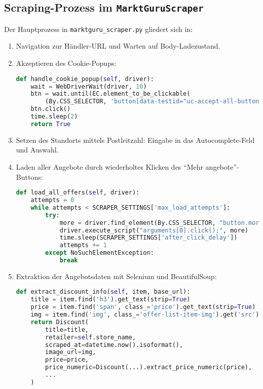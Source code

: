 \subsection{Scraping-Prozess im \texttt{MarktGuruScraper}}
Der Hauptprozess in \texttt{marktguru\_scraper.py} gliedert sich in:
\begin{enumerate}
  \item Navigation zur Händler-URL und Warten auf Body-Ladezustand.
  \item Akzeptieren des Cookie-Popups:
    \begin{lstlisting}[language=Python, caption={Cookie-Popup-Handling}]
def handle_cookie_popup(self, driver):
    wait = WebDriverWait(driver, 10)
    btn = wait.until(EC.element_to_be_clickable(
        (By.CSS_SELECTOR, 'button[data-testid="uc-accept-all-button"]')))
    btn.click()
    time.sleep(2)
    return True
    \end{lstlisting}
  \item Setzen des Standorts mittels Postleitzahl: Eingabe in das Autocomplete-Feld und Auswahl.  
  \item Laden aller Angebote durch wiederholtes Klicken des "`Mehr angebote"'-Buttons:
    \begin{lstlisting}[language=Python, caption={Angebotsliste vollständig laden}]
def load_all_offers(self, driver):
    attempts = 0
    while attempts < SCRAPER_SETTINGS['max_load_attempts']:
        try:
            more = driver.find_element(By.CSS_SELECTOR, "button.more-btn.uppercase")
            driver.execute_script("arguments[0].click();", more)
            time.sleep(SCRAPER_SETTINGS['after_click_delay'])
            attempts += 1
        except NoSuchElementException:
            break
    \end{lstlisting}
  \item Extraktion der Angebotsdaten mit Selenium und BeautifulSoup:
    \begin{lstlisting}[language=Python, caption={Datenextraktion aus einem Listeneintrag}]
def extract_discount_info(self, item, base_url):
    title = item.find('h3').get_text(strip=True)
    price = item.find('span', class_='price').get_text(strip=True)
    img = item.find('img', class_='offer-list-item-img').get('src')
    return Discount(
        title=title,
        retailer=self.store_name,
        scraped_at=datetime.now().isoformat(),
        image_url=img,
        price=price,
        price_numeric=Discount(...).extract_price_numeric(price),
        ...
    )
    \end{lstlisting}
\end{enumerate}


